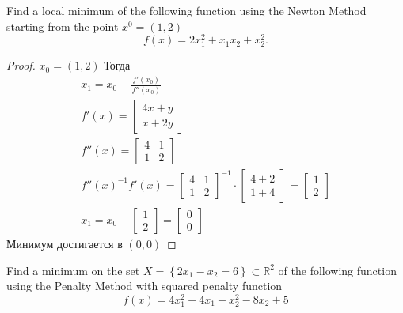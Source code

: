 \begin{prob}
    Find a local minimum of the following function using the Newton Method starting from the point $x^0=(1,2)$
    $$
    f(x)=2 x_1^2+x_1 x_2+x_2^2 .
    $$
\end{prob}

\begin{proof}
    $x_0 = (1,2)$
    Тогда
    \begin{gather*}
        x_1 = x_0 - \frac{f'(x_0)}{f''(x_0)}\\
        f'(x) = 
        \begin{bmatrix}
            4x + y\\
            x + 2y
        \end{bmatrix}\\
        f''(x) =
        \begin{bmatrix}
            4 & 1\\
            1 & 2
        \end{bmatrix}\\
        f''(x)^{-1} f'(x) = 
        \begin{bmatrix}
            4 & 1\\
            1 & 2
        \end{bmatrix}^{-1}
        \cdot
        \begin{bmatrix}
            4 + 2\\
            1 + 4
        \end{bmatrix}
        =
        \begin{bmatrix}
            1\\
            2
        \end{bmatrix}\\
        x_1 = x_0 - 
        \begin{bmatrix}
            1\\
            2
        \end{bmatrix}
        =
        \begin{bmatrix}
            0\\
            0
        \end{bmatrix}
    \end{gather*}
    Минимум достигается в $(0,0)$
\end{proof}
\vskip 0.4in





\begin{prob}
    Find a minimum on the set $X=\left\{2 x_1-x_2=6\right\} \subset \mathbb{R}^2$ of the following function using the Penalty Method with squared penalty function
    $$
    f(x) = 4x_1^2 + 4x_1 + x_2^2 - 8x_2 + 5
    $$
\end{prob}

